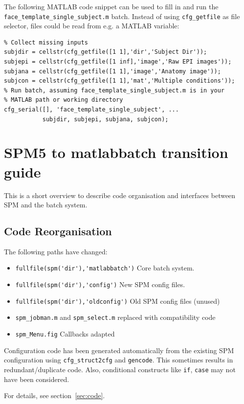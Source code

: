 \documentclass[a4paper]{book}
\begin{document}
The following MATLAB code snippet can be used to fill in and run the
\verb|face_template_single_subject.m| batch. Instead of using
\verb|cfg_getfile| as file selector, files could be read from e.g. a MATLAB
variable: 

\begin{verbatim}
% Collect missing inputs
subjdir = cellstr(cfg_getfile([1 1],'dir','Subject Dir'));
subjepi = cellstr(cfg_getfile([1 inf],'image','Raw EPI images'));
subjana = cellstr(cfg_getfile([1 1],'image','Anatomy image'));
subjcon = cellstr(cfg_getfile([1 1],'mat','Multiple conditions'));
% Run batch, assuming face_template_single_subject.m is in your 
% MATLAB path or working directory
cfg_serial([], 'face_template_single_subject', ...
           subjdir, subjepi, subjana, subjcon);
\end{verbatim}

\section{SPM5 to matlabbatch transition guide}
\label{sec:overview}

This is a short overview to describe code organisation and interfaces between
SPM and the batch system.

\subsection{Code Reorganisation}
\label{sec:overcode}

The following paths have changed:
\begin{itemize}
\item \verb|fullfile(spm('dir'),'matlabbatch')| Core batch system.
\item \verb|fullfile(spm('dir'),'config')| New SPM config files.
\item \verb|fullfile(spm('dir'),'oldconfig')| Old SPM config files (unused)
\item \verb|spm_jobman.m| and \verb|spm_select.m| replaced with compatibility
  code
\item \verb|spm_Menu.fig| Callbacks adapted
\end{itemize}

Configuration code has been generated automatically from the existing SPM
configuration using \verb|cfg_struct2cfg| and \verb|gencode|. This sometimes
results in redundant/duplicate code. Also, conditional constructs like
\verb|if|, \verb|case| may not have been considered. 

For details, see section~\ref{sec:code}. 
\end{document}
